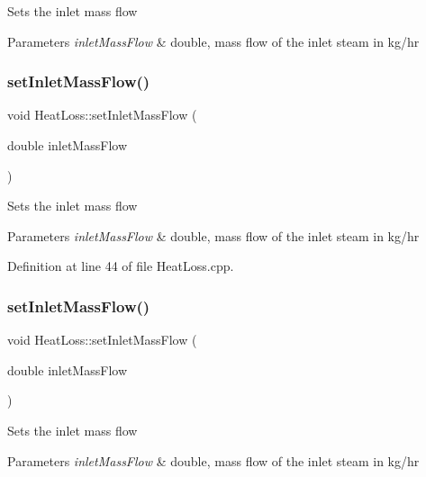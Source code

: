 Sets the inlet mass flow 
\begin{DoxyParams}{Parameters}
{\em inlet\+Mass\+Flow} & double, mass flow of the inlet steam in kg/hr \\
\hline
\end{DoxyParams}
\mbox{\label{class_heat_loss_ac4154dc9922b6ddf3f2e7a10cc64c61f}} 
\subsubsection{\texorpdfstring{set\+Inlet\+Mass\+Flow()}{setInletMassFlow()}\hspace{0.1cm}{\footnotesize\ttfamily [2/3]}}
{\footnotesize\ttfamily void Heat\+Loss\+::set\+Inlet\+Mass\+Flow (\begin{DoxyParamCaption}\item[{double}]{inlet\+Mass\+Flow }\end{DoxyParamCaption})}

Sets the inlet mass flow 
\begin{DoxyParams}{Parameters}
{\em inlet\+Mass\+Flow} & double, mass flow of the inlet steam in kg/hr \\
\hline
\end{DoxyParams}


Definition at line 44 of file Heat\+Loss.\+cpp.

\mbox{\label{class_heat_loss_ac4154dc9922b6ddf3f2e7a10cc64c61f}} 
\subsubsection{\texorpdfstring{set\+Inlet\+Mass\+Flow()}{setInletMassFlow()}\hspace{0.1cm}{\footnotesize\ttfamily [3/3]}}
{\footnotesize\ttfamily void Heat\+Loss\+::set\+Inlet\+Mass\+Flow (\begin{DoxyParamCaption}\item[{double}]{inlet\+Mass\+Flow }\end{DoxyParamCaption})}

Sets the inlet mass flow 
\begin{DoxyParams}{Parameters}
{\em inlet\+Mass\+Flow} & double, mass flow of the inlet steam in kg/hr \\
\hline
\end{DoxyParams}
\mbox{\label{class_heat_loss_ab0a6b1f2a964d161d25758318f25f7e3}} 
